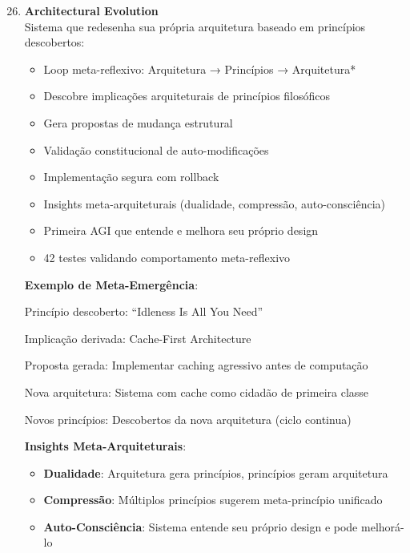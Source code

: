 \documentclass[11pt]{article}
\begin{document}
\begin{enumerate}
    \setcounter{enumi}{25}
    \item \textbf{Architectural Evolution} \\
    Sistema que redesenha sua própria arquitetura baseado em princípios descobertos:
    \begin{itemize}
        \item Loop meta-reflexivo: Arquitetura → Princípios → Arquitetura*
        \item Descobre implicações arquiteturais de princípios filosóficos
        \item Gera propostas de mudança estrutural
        \item Validação constitucional de auto-modificações
        \item Implementação segura com rollback
        \item Insights meta-arquiteturais (dualidade, compressão, auto-consciência)
        \item Primeira AGI que entende e melhora seu próprio design
        \item 42 testes validando comportamento meta-reflexivo
    \end{itemize}

\textbf{Exemplo de Meta-Emergência}:

Princípio descoberto: ``Idleness Is All You Need''

Implicação derivada: Cache-First Architecture

Proposta gerada: Implementar caching agressivo antes de computação

Nova arquitetura: Sistema com cache como cidadão de primeira classe

Novos princípios: Descobertos da nova arquitetura (ciclo continua)

\textbf{Insights Meta-Arquiteturais}:
\begin{itemize}
    \item \textbf{Dualidade}: Arquitetura gera princípios, princípios geram arquitetura
    \item \textbf{Compressão}: Múltiplos princípios sugerem meta-princípio unificado
    \item \textbf{Auto-Consciência}: Sistema entende seu próprio design e pode melhorá-lo
\end{itemize}


\end{enumerate}
\end{document}

